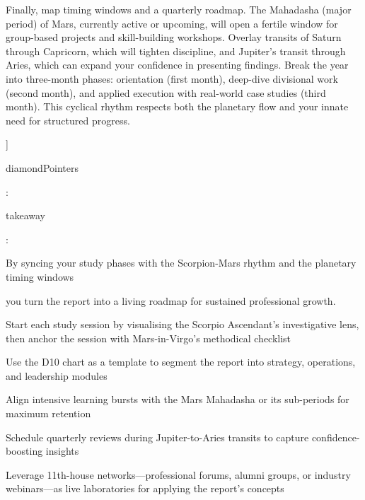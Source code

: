 {\fontsize{9}{13}\selectfont Finally, map timing windows and a quarterly roadmap. The Mahadasha (major period) of Mars, currently active or upcoming, will open a fertile window for group-based projects and skill-building workshops. Overlay transits of Saturn through Capricorn, which will tighten discipline, and Jupiter's transit through Aries, which can expand your confidence in presenting findings. Break the year into three-month phases: orientation (first month), deep-dive divisional work (second month), and applied execution with real-world case studies (third month). This cyclical rhythm respects both the planetary flow and your innate need for structured progress.}\par\vspace{1.8mm}

{\fontsize{9}{13}\selectfont ]}\par\vspace{1.8mm}

{\fontsize{9}{13}\selectfont diamondPointers}\par\vspace{1.8mm}

{\fontsize{9}{13}\selectfont :}\par\vspace{1.8mm}

{\fontsize{9}{13}\selectfont takeaway}\par\vspace{1.8mm}

{\fontsize{9}{13}\selectfont :}\par\vspace{1.8mm}

{\fontsize{9}{13}\selectfont By syncing your study phases with the Scorpion-Mars rhythm and the planetary timing windows}\par\vspace{1.8mm}

{\fontsize{9}{13}\selectfont you turn the report into a living roadmap for sustained professional growth.}\par\vspace{1.8mm}

\begin{diamondlist}
  \item {\fontsize{8.5}{12}\selectfont Start each study session by visualising the Scorpio Ascendant's investigative lens, then anchor the session with Mars-in-Virgo's methodical checklist}
  \item {\fontsize{8.5}{12}\selectfont Use the D10 chart as a template to segment the report into strategy, operations, and leadership modules}
  \item {\fontsize{8.5}{12}\selectfont Align intensive learning bursts with the Mars Mahadasha or its sub-periods for maximum retention}
  \item {\fontsize{8.5}{12}\selectfont Schedule quarterly reviews during Jupiter-to-Aries transits to capture confidence-boosting insights}
  \item {\fontsize{8.5}{12}\selectfont Leverage 11th-house networks---professional forums, alumni groups, or industry webinars---as live laboratories for applying the report's concepts}
\end{diamondlist}

